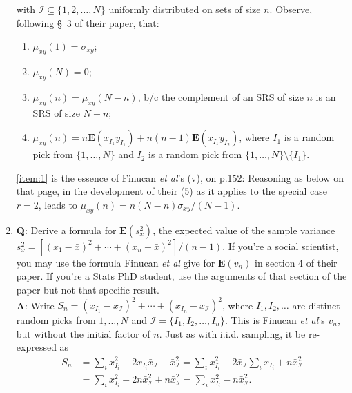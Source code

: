 \documentclass{article}
\begin{document}
\begin{enumerate}
with $\mathcal{I} \subseteq  \{1,2, \ldots, N\}$ uniformly distributed
on sets of size $n$. Observe, following \S~3 of their paper, that:
  \begin{enumerate}
  \item  $\mu_{xy}(1) = \sigma_{xy}$;
  \item $\mu_{xy}(N) = 0$;
  \item $\mu_{xy}(n) = \mu_{xy}(N-n)$, b/c the complement of an SRS of size $n$ is an SRS of size $N-n$;
  \item $\mu_{xy}(n) =  n \mathbf{E}(x_{I_{1}} y_{I_{1}}) + n(n-1)
    \mathbf{E}(x_{I_{1}} y_{I_{2}})$, where $I_{1}$ is a random pick from $\{1,
    \ldots, N\}$ and $I_{2}$ is a random pick from $\{1,
    \ldots, N\} \setminus \{I_{1}\}$.   \label{item:1}
  \end{enumerate}
\vspace{-3ex}
\ref{item:1} is the essence of Finucan \textit{et al}'s (v), on
p.152:
  Reasoning as below on that page, in the development of their (5) as
  it applies to the special case $r=2$, leads to $\mu_{xy}(n) = n(N-n) \sigma_{xy}/(N-1).$
\item \textbf{Q}: Derive a formula for $\mathbf{E}(s^2_x)$, the expected
    value of the sample variance
    $s^2_x = [(x_1 - \bar x)^2 + \cdots + (x_n - \bar x)^2 ]/(n-1) $. If
    you're a social scientist, you may use the formula Finucan \textit{et al}
    give for $\mathbf{E}(v_n)$ in section 4 of their paper. If you're a
    Stats PhD student, use the arguments of that section of the paper
    but not that specific result.\\
\textbf{A}: Write $S_{n} = (x_{I_{1}} - \bar{x}_{\mathcal{I}})^2 +
\cdots + (x_{I_{n}} - \bar{x}_{\mathcal{I}})^2$, where $I_{1}, I_{2},
\dots$ are distinct random picks from $1, \ldots, N$ and $\mathcal{I}
= \{I_{1}, I_{2}, \ldots, I_{n}\} $.  This is Finucan \textit{et al}'s $v_{n}$,
but without the initial factor of $n$. Just as with i.i.d. sampling, it be re-expressed as 
\begin{align*}
  S_{n} & = \sum_{i} x_{I_{i}}^{2} - 2x_{I_{i}}\bar{x}_\mathcal{I} + \bar{x}_\mathcal{I}^{2} = \sum_{i}
          x_{I_{i}}^{2} - 2\bar{x}_\mathcal{I} \sum_{i}x_{I_{i}} + n\bar{x}_\mathcal{I}^{2} \\
 & = \sum_{i}x_{I_{i}}^{2} - 2n \bar{x}_\mathcal{I}^{2} +
   n\bar{x}_\mathcal{I}^{2} = \sum_{i}x_{I_{i}}^{2} -
   n\bar{x}_\mathcal{I}^{2}.

\end{align*}
\end{enumerate}
\end{document}

